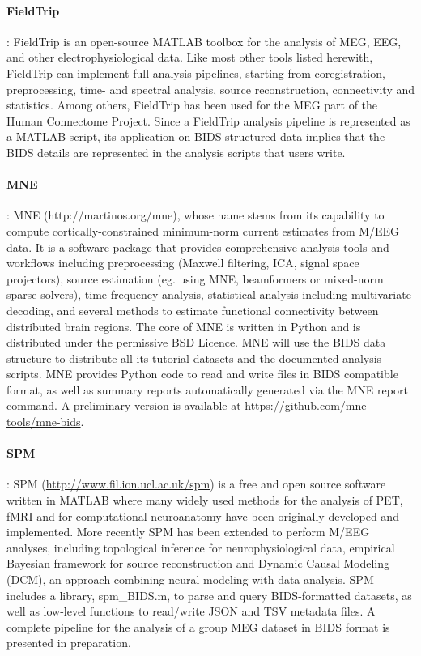 \paragraph{FieldTrip}\citep{oostenveld2010fieldtrip}: FieldTrip is an open-source MATLAB toolbox for the analysis of MEG, EEG, and other electrophysiological data. Like most other tools listed herewith, FieldTrip can  implement full analysis pipelines, starting from coregistration, preprocessing, time- and spectral analysis, source reconstruction, connectivity and statistics. Among others, FieldTrip has been used for the MEG part of the Human Connectome Project. Since a FieldTrip analysis pipeline is represented as a MATLAB script, its application on BIDS structured data implies that the BIDS details are represented in the analysis scripts that users write. 

\paragraph{MNE}\citep{gramfort2013meg, mne}: MNE (http://martinos.org/mne), whose name stems from its capability to compute cortically-constrained minimum-norm current estimates from M/EEG data. It is a software package that provides comprehensive analysis tools and workflows including preprocessing (Maxwell filtering, ICA, signal space projectors), source estimation (eg. using MNE, beamformers or mixed-norm sparse solvers), time-frequency analysis, statistical analysis including multivariate decoding, and several methods to estimate functional connectivity between distributed brain regions. The core of MNE is written in Python and is distributed under the permissive BSD Licence. MNE will use the BIDS data structure to distribute all its tutorial datasets and the documented analysis scripts. MNE provides Python code to read and write files in BIDS compatible format, as well as summary reports automatically generated via the MNE report command. A preliminary version is available at \url{https://github.com/mne-tools/mne-bids}. 

\paragraph{SPM}\citep{litvak2011eeg}: SPM (\url{http://www.fil.ion.ucl.ac.uk/spm}) is a free and open source software written in MATLAB where many widely used methods for the analysis of PET, fMRI and for computational neuroanatomy have been originally developed and implemented. More recently SPM has been extended to perform M/EEG analyses, including topological inference for neurophysiological data, empirical Bayesian framework for source reconstruction and Dynamic Causal Modeling (DCM), an approach combining neural modeling with data analysis. SPM~\citep{litvak2011eeg} includes a library, spm\_BIDS.m, to parse and query BIDS-formatted datasets, as well as low-level functions to read/write JSON and TSV metadata files. A complete pipeline for the analysis of a group MEG dataset in BIDS format is presented in preparation.

